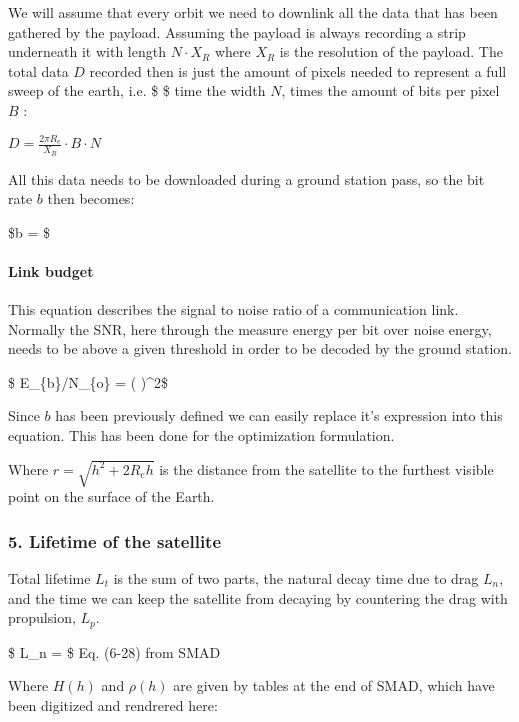 \documentclass[11pt]{article}
\begin{document}
    We will assume that every orbit we need to downlink all the data that
has been gathered by the payload. Assuming the payload is always
recording a strip underneath it with length \(N\cdot X_R\) where \(X_R\)
is the resolution of the payload. The total data \(D\) recorded then is
just the amount of pixels needed to represent a full sweep of the earth,
i.e. \$ \$ time the width \(N\), times the amount of
bits per pixel \(B\) :

\(D = \frac{2\pi R_e}{X_R}\cdot B\cdot N\)

All this data needs to be downloaded during a ground station pass, so
the bit rate \(b\) then becomes:

\$b =  \$

    \hypertarget{link-budget}{%
\paragraph{Link budget}\label{link-budget}}

This equation describes the signal to noise ratio of a communication
link. Normally the SNR, here through the measure energy per bit over
noise energy, needs to be above a given threshold in order to be decoded
by the ground station.

\$ E\_\{b\}/N\_\{o\} =
\eta \left(
 \right)\^{}2\$

Since \(b\) has been previously defined we can easily replace it's
expression into this equation. This has been done for the optimization
formulation.

Where \(r = \sqrt{h^2 + 2R_eh}\) is the distance from the satellite to
the furthest visible point on the surface of the Earth.

    \hypertarget{lifetime-of-the-satellite}{%
\subsubsection{5. Lifetime of the
satellite}\label{lifetime-of-the-satellite}}

    Total lifetime \(L_t\) is the sum of two parts, the natural decay time
due to drag \(L_n\), and the time we can keep the satellite from
decaying by countering the drag with propulsion, \(L_p\).

\$ L\_n =
 \$ Eq.
(6-28) from SMAD

Where \(H(h)\) and \(\rho(h)\) are given by tables at the end of SMAD,
which have been digitized and rendrered here:
\end{document}
